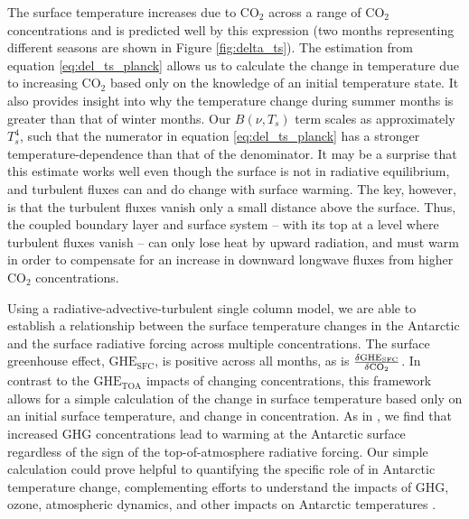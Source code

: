 \documentclass[draft]{agujournal2019}
\begin{document}
The surface temperature increases due to CO$_2$ across a range of CO$_2$ concentrations and is predicted well by this expression (two months representing different seasons are shown in Figure \ref{fig:delta_ts}). The estimation from equation \ref{eq:del_ts_planck} allows us to calculate the change in temperature due to increasing CO$_2$ based only on the knowledge of an initial temperature state. It also provides insight into why the temperature change during summer months is greater than that of winter months. Our $B(\nu, T_s)$ term scales as approximately $T_s^4$, such that the numerator in equation \ref{eq:del_ts_planck} has a stronger temperature-dependence than that of the denominator. It may be a surprise that this estimate works well even though the surface is not in radiative equilibrium, and turbulent fluxes can and do change with surface warming. The key, however, is that the turbulent fluxes vanish only a small distance above the surface. Thus, the coupled boundary layer and surface system -- with its top at a level where turbulent fluxes vanish -- can only lose heat by upward radiation, and must warm in order to compensate for an increase in downward longwave fluxes from higher CO$_2$ concentrations.  

Using a radiative-advective-turbulent single column model, we are able to establish a relationship between the surface temperature changes in the Antarctic and the surface radiative forcing across multiple  concentrations. The  surface greenhouse effect, $\text{GHE}_\text{{SFC}}$, is positive across all months, as is $\frac{\delta{\text{GHE}_\text{{SFC}}}}{\delta\ce{CO_2}}$. In contrast to the $\text{GHE}_\text{{TOA}}$ impacts of changing  concentrations, this framework allows for a simple calculation of the change in surface temperature based only on an initial surface temperature, and change in  concentration. As in , we find that increased GHG concentrations lead to warming at the Antarctic surface regardless of the sign of the top-of-atmosphere radiative forcing. Our simple calculation could prove helpful to quantifying the specific role of  in Antarctic temperature change, complementing efforts to understand the impacts of GHG, ozone, atmospheric dynamics, and other impacts on Antarctic temperatures \cite{shindell_southern_2004, thompson_signatures_2011}.
\end{document}
